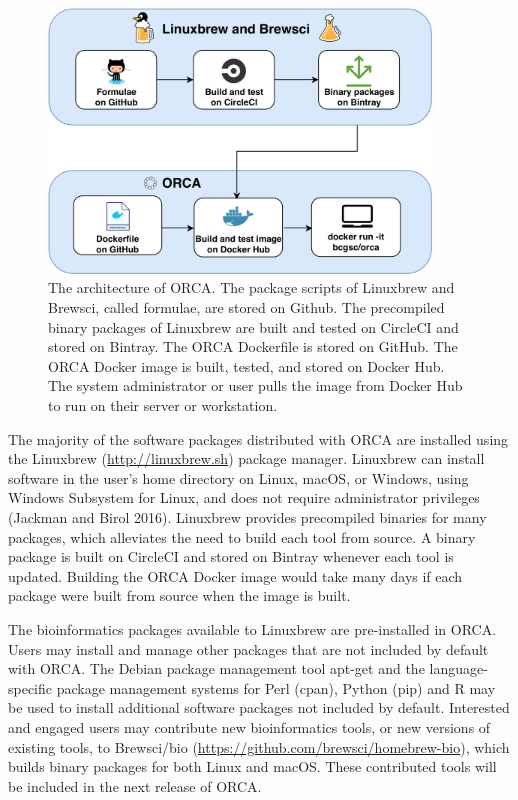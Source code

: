 \documentclass[
  12pt,
  oneside,
  openany]{book}
\begin{document}
\begin{figure}
\hypertarget{fig:orca}{%
\centering
\includegraphics[width=4in,height=\textheight]{orca/architecture.png}
\caption[The architecture of ORCA.]{The architecture of ORCA. The package scripts of Linuxbrew and Brewsci, called formulae, are stored on Github. The precompiled binary packages of Linuxbrew are built and tested on CircleCI and stored on Bintray. The ORCA Dockerfile is stored on GitHub. The ORCA Docker image is built, tested, and stored on Docker Hub. The system administrator or user pulls the image from Docker Hub to run on their server or workstation.}\label{fig:orca}
}
\end{figure}

The majority of the software packages distributed with ORCA are installed using the Linuxbrew (\url{http://linuxbrew.sh}) package manager. Linuxbrew can install software in the user's home directory on Linux, macOS, or Windows, using Windows Subsystem for Linux, and does not require administrator privileges (Jackman and Birol 2016). Linuxbrew provides precompiled binaries for many packages, which alleviates the need to build each tool from source. A binary package is built on CircleCI and stored on Bintray whenever each tool is updated. Building the ORCA Docker image would take many days if each package were built from source when the image is built.

The bioinformatics packages available to Linuxbrew are pre-installed in ORCA. Users may install and manage other packages that are not included by default with ORCA. The Debian package management tool apt-get and the language-specific package management systems for Perl (cpan), Python (pip) and R may be used to install additional software packages not included by default. Interested and engaged users may contribute new bioinformatics tools, or new versions of existing tools, to Brewsci/bio (\url{https://github.com/brewsci/homebrew-bio}), which builds binary packages for both Linux and macOS. These contributed tools will be included in the next release of ORCA.
\end{document}
